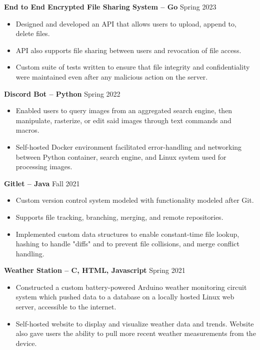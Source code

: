\documentclass{article}
\begin{document}
    


    \begin{adjustwidth}{1em}{1em}

        \textbf{End to End Encrypted File Sharing System -- Go} \hfill Spring 2023
        \begin{itemize}
            \item Designed and developed an API that allows users to upload, append to, delete files.
            \item API also supports file sharing between users and revocation of file access.
            \item Custom suite of tests written to ensure that file integrity and confidentiality were maintained even after any malicious action on the server.
        \end{itemize}

        \vspace{1mm}

        \textbf{Discord Bot -- Python} \hfill Spring 2022
        \begin{itemize}
            \item Enabled users to query images from an aggregated search engine, then manipulate, rasterize, or edit said images through text commands and macros.
            \item Self-hosted Docker environment facilitated error-handling and networking between Python container, search engine, and Linux system used for processing images.
        \end{itemize}

        \textbf{Gitlet -- Java} \hfill Fall 2021 
        \begin{itemize}
            \item Custom version control system modeled with functionality modeled after Git.
            \item Supports file tracking, branching, merging, and remote repositories.
            \item Implemented custom data structures to enable constant-time file lookup, hashing to handle "diffs" and to prevent file collisions, and merge conflict handling.
        \end{itemize}

        \vspace{1mm}

        \noindent \textbf{Weather Station -- C, HTML, Javascript} \hfill Spring 2021
        \begin{itemize}
            \item Constructed a custom battery-powered Arduino weather monitoring circuit system which pushed data to a database on a locally hosted Linux web server, accessible to the internet. 
            \item Self-hosted website to display and visualize weather data and trends. Website also gave users the ability to pull more recent weather measurements from the device.
        \end{itemize}

        
    \end{adjustwidth}
\end{document}
